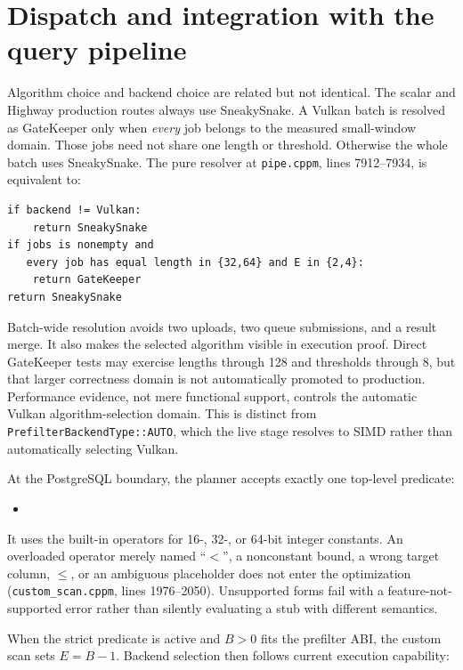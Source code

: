 \section{Dispatch and integration with the query pipeline}
\label{sec:prefilter-dispatch}

Algorithm choice and backend choice are related but not identical.  The scalar
and Highway production routes always use SneakySnake.  A Vulkan batch is
resolved as GateKeeper only when \emph{every} job belongs to the measured
small-window domain.  Those jobs need not share one length or threshold.
Otherwise the whole batch uses SneakySnake.  The pure resolver at
\texttt{pipe.cppm}, lines 7912--7934, is equivalent to:

\begin{verbatim}
if backend != Vulkan:
    return SneakySnake
if jobs is nonempty and
   every job has equal length in {32,64} and E in {2,4}:
    return GateKeeper
return SneakySnake
\end{verbatim}

Batch-wide resolution avoids two uploads, two queue submissions, and a result
merge.  It also makes the selected algorithm visible in execution proof.
Direct GateKeeper tests may exercise lengths through 128 and thresholds through
8, but that larger correctness domain is not automatically promoted to
production.  Performance evidence, not mere functional support, controls the
automatic Vulkan algorithm-selection domain.  This is distinct from
\texttt{PrefilterBackendType::AUTO}, which the live stage resolves to SIMD
rather than automatically selecting Vulkan.

At the PostgreSQL boundary, the planner accepts exactly one top-level
predicate:

\begin{itemize}
    \item {}
\end{itemize}

It uses the built-in operators for 16-, 32-, or 64-bit integer constants.  An
overloaded operator merely named ``\(<\)'', a nonconstant bound, a wrong target
column, \(\le\), or an ambiguous placeholder does not enter the optimization
(\texttt{custom\_scan.cppm}, lines 1976--2050).  Unsupported forms fail with a
feature-not-supported error rather than silently evaluating a stub with
different semantics.

When the strict predicate is active and \(B>0\) fits the prefilter ABI, the
custom scan sets \(E=B-1\).  Backend selection then follows current execution
capability:

